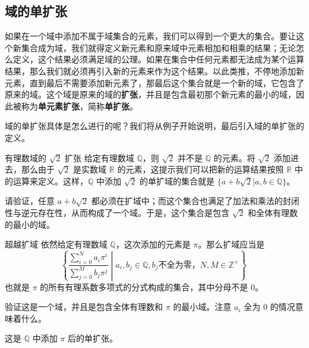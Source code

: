 
\begin{issues}
\end{issues}



\subsection{域的单扩张}
如果在一个域中添加不属于域集合的元素，我们可以得到一个更大的集合。要让这个新集合成为域，我们就得定义新元素和原来域中元素相加和相乘的结果；无论怎么定义，这个结果必须满足域的公理。如果在集合中任何元素都无法成为某个运算结果，那么我们就必须再引入新的元素来作为这个结果。以此类推，不停地添加新元素，直到最后不需要添加新元素了，那最后这个集合就是一个新的域，它包含了原来的域。这个域是原来的域的\textbf{扩张}，并且是包含最初那个新元素的最小的域，因此被称为\textbf{单元素扩张}，简称\textbf{单扩张}。

域的单扩张具体是怎么进行的呢？我们将从例子开始说明，最后引入域的单扩张的定义。

\begin{exercise}{有理数域的 $\sqrt{2}$ 扩张}\label{exe_FldExp_1}
给定有理数域 $\mathbb{Q}$，则 $\sqrt{2}$ 并不是 $\mathbb{Q}$ 的元素。将 $\sqrt{2}$ 添加进去，那么由于 $\sqrt{2}$ 是实数域 $\mathbb{R}$ 的元素，这提示我们可以把新的运算结果按照 $\mathbb{R}$ 中的运算来定义。这样，$\mathbb{Q}$ 中添加 $\sqrt{2}$ 的单扩域的集合就是 $\{a+b\sqrt{2}|a, b\in\mathbb{Q}\}$。

请验证，任意 $a+b\sqrt{2}$ 都必须在扩域中；而这个集合也满足了加法和乘法的封闭性与逆元存在性，从而构成了一个域。于是，这个集合是包含 $\sqrt{2}$ 和全体有理数的最小的域。
\end{exercise}

\begin{exercise}{超越扩域}\label{exe_FldExp_2}
依然给定有理数域 $\mathbb{Q}$，这次添加的元素是 $\pi$。那么扩域应当是
\begin{equation}
\left\{ \frac{\sum_{i=0}^N a_i\pi^i}{\sum_{j=0}^M b_j\pi^j} \middle| a_i, b_j\in\mathbb{Q}, b_j\text{不全为零，} N, M\in\mathbb{Z}^+ \right\}~
\end{equation}
也就是 $\pi$ 的所有有理系数多项式的分式构成的集合，其中分母不是 $0$。

验证这是一个域，并且是包含全体有理数和 $\pi$ 的最小域。注意 $a_i$ 全为 $0$ 的情况意味着什么。

这是 $\mathbb{Q}$ 中添加 $\pi$ 后的单扩张。
\end{exercise}




